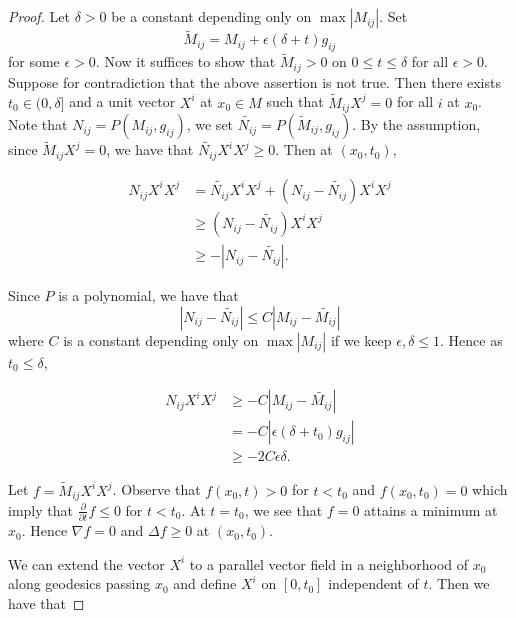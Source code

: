 \documentclass[a4paper]{report}
\theoremstyle{remark}
\begin{document}
\begin{proof}
	Let $\delta >0$ be a constant depending only on $\max \left| M_{ij }^{}  \right| $.
	Set \[\tilde{M}_{ij }^{}  = M_{ij }^{} + \epsilon (\delta +t) g_{ij}^{} \] for some $\epsilon >0$. Now it suffices to show that $\tilde{M}_{ij }^{} >0$ on $0 \leq t \leq \delta $ for all $\epsilon >0$.
	Suppose for contradiction that the above assertion is not true. Then there exists $t_0 \in (0,\delta ]$ and a unit vector $X^i $ at $x_0 \in M$ such that $\tilde{M}_{ij }^{} X^j=0$ for all $i$  at $x_0$. Note that $N_{ij }^{} = P(M_{ij }^{} , g_{ij}^{} )$, we set $\tilde{N_{ij }^{} }=P(\tilde{M}_{ij }^{} , g_{ij }^{} )$. By the assumption, since $\tilde{M}_{ij }^{} X^j=0$, we have that $\tilde{N_{ij }^{}} X^i X^j \geq 0$. Then at $(x_0,t_0)$, 

	\begin{equation*}
	\begin{split}
		N_{ij }^{} X^i X^j
	&= \tilde{N_{ij }^{}} X^i X^j + (N_{ij }^{} - \tilde{N_{ij }^{}}) X^i X^j\\
	& \geq (N_{ij }^{} - \tilde{N_{ij }^{}}) X^i X^j\\
	& \geq -\left| N_{ij }^{} - \tilde{N_{ij }^{}} \right|.
	\end{split}
	\end{equation*}

	Since $P$ is a polynomial, we have that \[\left| N_{ij }^{} - \tilde{N_{ij }^{}} \right| \leq C \left| M_{ij }^{} - \tilde{M_{ij }^{}} \right|\] where $C$ is a constant depending only on $\max \left| M_{ij }^{}  \right| $ if we keep $\epsilon , \delta \leq 1$. Hence as $t_0 \leq \delta $,

	\begin{equation}
	\begin{split}
		N_{ij }^{} X^i X^j 
		& \geq -C \left| M_{ij }^{} - \tilde{M_{ij }^{}} \right|\\
		&= -C \left| \epsilon (\delta + t_0) g_{ij }^{}  \right|\\
		& \geq -2C \epsilon \delta.
	\end{split}
	\end{equation}

	Let $f=\tilde{M}_{ij }^{} X^i X^j$. Observe that $f ( x_0,t) > 0 $ for $t<t_0$ and $f ( x_0,t_0) =0$ which imply that $\frac{\partial }{\partial t} f \leq 0$ for $t<t_0$. At $t=t_0$, we see that $f=0$ attains a minimum at $x_0$. Hence $\nabla f=0$ and $\Delta f \geq 0$ at $( x_0,t_0) $.

	We can extend the vector $X^i$ to a parallel vector field in a neighborhood of $x_0$ along geodesics passing $x_0$ and define $X^i$ on $[0,t_0]$ independent of $t$.
	Then we have that
	

\end{proof}
\end{document}
